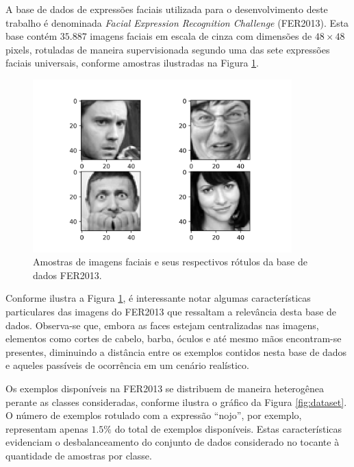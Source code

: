 A base de dados de expressões faciais utilizada para o desenvolvimento deste trabalho é denominada \emph{Facial Expression Recognition Challenge} (FER2013). Esta base contém $35.887$ imagens faciais em escala de cinza com dimensões de $48\times 48$ pixels, rotuladas de maneira supervisionada segundo uma das sete expressões faciais universais, conforme amostras ilustradas na Figura \ref{fig:samples}. 

\begin{figure}[!htb]
    \centering
    \caption{Amostras de imagens faciais e seus respectivos rótulos da base de dados FER2013.} \label{fig:samples}
    \includegraphics[width=10cm]{images/samples.png}
\end{figure}

Conforme ilustra a Figura \ref{fig:samples}, é interessante notar algumas características particulares das imagens do FER2013 que ressaltam a relevância desta base de dados. Observa-se que, embora as faces estejam centralizadas nas imagens, elementos como cortes de cabelo, barba, óculos e até mesmo mãos encontram-se presentes, diminuindo a distância entre os exemplos contidos nesta base de dados e aqueles passíveis de ocorrência em um cenário realístico.

Os exemplos disponíveis na FER2013 se distribuem de maneira heterogênea perante as classes consideradas, conforme ilustra o gráfico da Figura \ref{fig:dataset}. O número de exemplos rotulado com a expressão ``nojo'', por exemplo, representam apenas $1.5\%$ do total de exemplos disponíveis. Estas características evidenciam o desbalanceamento do conjunto de dados considerado no tocante à quantidade de amostras por classe. 

